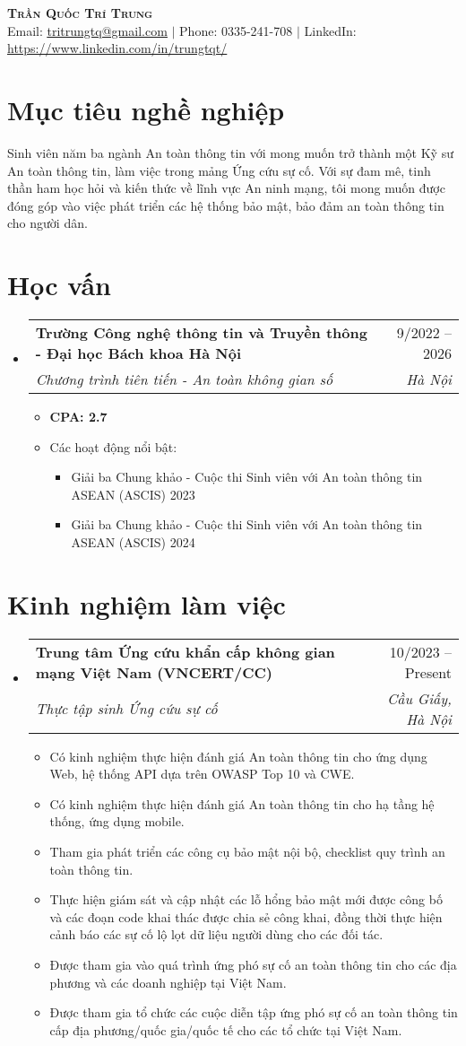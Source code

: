 \documentclass[letterpaper,10pt]{article}
\makeatletter
\newcommand{\link}[2]{\href{#1}{\color{blue}\underline{#2}}}
\newcommand{\resumeItem}[1]{
  \item\small{
    {#1 \vspace{-2pt}}
  }
}
\newcommand{\resumeSubheading}[4]{
  \vspace{-2pt}\item
  \begin{tabular*}{0.97\textwidth}[t]{l@{\extracolsep{\fill}}r}
    \textbf{#1} & #2 \\
    \textit{\small#3} & \textit{\small #4} \\
  \end{tabular*}\vspace{-7pt}
}
\newcommand{\resumeSubHeadingListStart}{\begin{itemize}[leftmargin=0.15in, label={}]}
\newcommand{\resumeSubHeadingListEnd}{\end{itemize}}
\newcommand{\resumeItemListStart}{\begin{itemize}}
\newcommand{\resumeItemSubListStart}{\begin{itemize}\setlength\itemsep{0.4em}}
\newcommand{\resumeItemListEnd}{\end{itemize}\vspace{-5pt}}
\newcommand{\resumeItemSubListEnd}{\end{itemize}}
\makeatother
\begin{document}
\begin{center}
	\textbf{\huge \scshape Trần Quốc Trí Trung} \\ \vspace{3pt}
	\small Email: \link{mailto:tritrungtq@gmail.com}{tritrungtq@gmail.com} $|$
	Phone: 0335-241-708 $|$
	LinkedIn: \link{https://www.linkedin.com/in/trungtqt/}{https://www.linkedin.com/in/trungtqt/}
        
\end{center}

\section{Mục tiêu nghề nghiệp}
Sinh viên năm ba ngành An toàn thông tin với mong muốn trở thành một Kỹ sư An toàn thông tin, làm việc trong mảng Ứng cứu sự cố. Với sự đam mê, tinh thần ham học hỏi và kiến thức về lĩnh vực An ninh mạng, tôi mong muốn được đóng góp vào việc phát triển các hệ thống bảo mật, bảo đảm an toàn thông tin cho người dân.

\section{Học vấn}
\resumeSubHeadingListStart
\resumeSubheading
{Trường Công nghệ thông tin và Truyền thông - Đại học Bách khoa Hà Nội}{9/2022 -- 2026}
{Chương trình tiên tiến - An toàn không gian số}{Hà Nội}

\resumeItemListStart
\resumeItem{\textbf{CPA: 2.7}}

\resumeItem{Các hoạt động nổi bật:}

\resumeItemSubListStart
\resumeItem{Giải ba Chung khảo - Cuộc thi Sinh viên với An toàn thông tin ASEAN (ASCIS) 2023 }
\resumeItem{Giải ba Chung khảo - Cuộc thi Sinh viên với An toàn thông tin ASEAN (ASCIS) 2024 }
\resumeItemSubListEnd
\resumeItemListEnd \resumeSubHeadingListEnd

\section{Kinh nghiệm làm việc} \resumeSubHeadingListStart

\resumeSubheading {Trung tâm Ứng cứu khẩn cấp không gian mạng Việt Nam (VNCERT/CC)}{10/2023 -- Present}
{Thực tập sinh Ứng cứu sự cố}{Cầu Giấy, Hà Nội}
\vspace{0.5pt}
\resumeItemListStart
\resumeItem{Có kinh nghiệm thực hiện đánh giá An toàn thông tin cho ứng dụng Web, hệ thống API dựa trên OWASP Top 10 và CWE.}
\resumeItem{Có kinh nghiệm thực hiện đánh giá An toàn thông tin cho hạ tầng hệ thống, ứng dụng mobile.}
\resumeItem{Tham gia phát triển các công cụ bảo mật nội bộ, checklist quy trình an toàn thông tin.}
\resumeItem{Thực hiện giám sát và cập nhật các lỗ hổng bảo mật mới được công bố và các đoạn code khai thác được chia sẻ công khai, đồng thời thực hiện cảnh báo các sự cố lộ lọt dữ liệu người dùng cho các đối tác.}
\resumeItem{Được tham gia vào quá trình ứng phó sự cố an toàn thông tin cho các địa phương và các doanh nghiệp tại Việt Nam.}
\resumeItem{Được tham gia tổ chức các cuộc diễn tập ứng phó sự cố an toàn thông tin cấp địa phương/quốc gia/quốc tế cho các tổ chức tại Việt Nam.}
\resumeItemListEnd
\resumeSubHeadingListEnd
\end{document}
